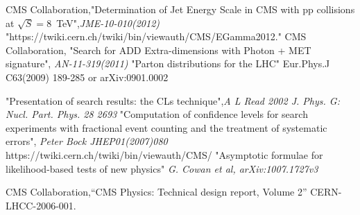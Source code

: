 \begin{thebibliography}{9}
 CMS Collaboration,"Determination of Jet Energy Scale in CMS with pp collisions at $\sqrt{S} = 8$~TeV",\textit{JME-10-010(2012)}
 "https://twiki.cern.ch/twiki/bin/viewauth/CMS/EGamma2012."
 CMS Collaboration, "Search for ADD Extra-dimensions with Photon + MET signature", \textit{AN-11-319(2011)}
 "Parton distributions for the LHC" Eur.Phys.J C63(2009) 189-285 or arXiv:0901.0002


 "Presentation of search results: the CLs technique",\textit{A L Read 2002 J. Phys. G: Nucl. Part. Phys. 28 2693}
 "Computation of confidence levels for search experiments with fractional event counting and the treatment of systematic errors", \textit{Peter Bock JHEP01(2007)080}
 https://twiki.cern.ch/twiki/bin/viewauth/CMS/
  "Asymptotic formulae for likelihood-based tests of new physics" \textit{G. Cowan et al, arXiv:1007.1727v3}

CMS Collaboration,``CMS Physics: Technical design report, Volume 2'' CERN-LHCC-2006-001.












\end{thebibliography}